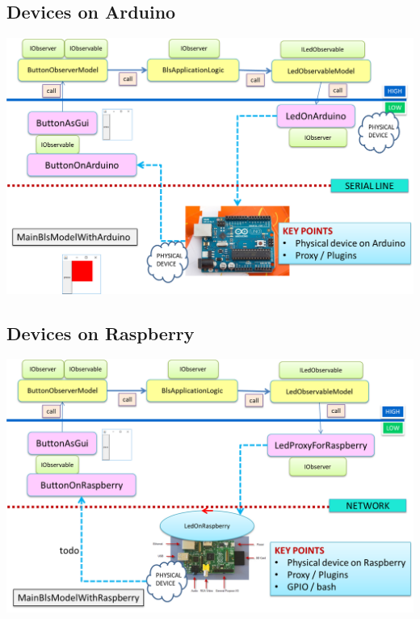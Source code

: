 \documentclass[10pt,a4paper,openright,twoside]{C:/Didattica/git/lab2014Bo/it.unibo.iss2015intro/docsInternal/contents/llncs}
\begin{document}
\subsection{Devices on Arduino}

\medskip 
\includegraphics[scale = 0.5]{img/bls18/bls18Obj2Arduino.png}


\subsection{Devices on Raspberry}

\medskip 
\includegraphics[scale = 0.5]{img/bls18/bls18Obj2Rasp.png}
\end{document}
